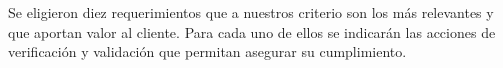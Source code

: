 %
%
%
%
%






Se eligieron diez requerimientos que a nuestros criterio son los más relevantes y que aportan valor al cliente. Para cada uno de ellos se indicarán  las acciones de verificación y validación que permitan asegurar su cumplimiento.

